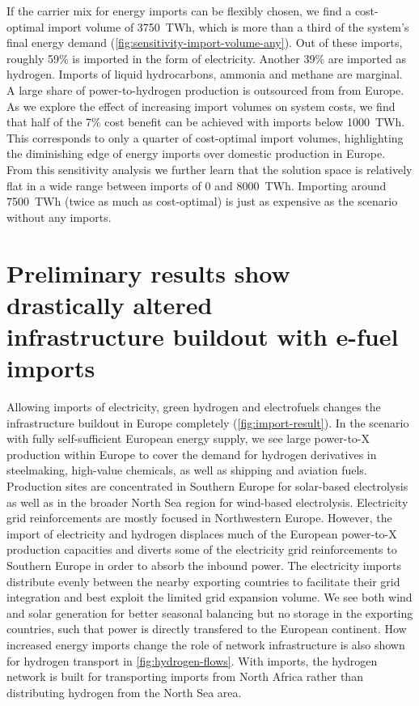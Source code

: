 \documentclass[10pt,5p,reversenotenum,lefttitle]{elsarticle}
\begin{document}
If the carrier mix for energy imports can be flexibly chosen, we find a
cost-optimal import volume of 3750~TWh, which is more than a third of the
system's final energy demand (\cref{fig:sensitivity-import-volume-any}). Out of
these imports, roughly 59\% is imported in the form of electricity. Another 39\%
are imported as hydrogen. Imports of liquid hydrocarbons, ammonia and methane
are marginal. A large share of power-to-hydrogen production is outsourced from
from Europe. As we explore the effect of increasing import volumes on system
costs, we find that half of the 7\% cost benefit can be achieved with imports
below 1000~TWh. This corresponds to only a quarter of cost-optimal import
volumes, highlighting the diminishing edge of energy imports over domestic
production in Europe. From this sensitivity analysis we further learn that the
solution space is relatively flat in a wide range between imports of 0 and
8000~TWh. Importing around 7500~TWh (twice as much as cost-optimal) is just as
expensive as the scenario without any imports.

\section*{Preliminary results show drastically altered\\infrastructure buildout with e-fuel imports}

Allowing imports of electricity, green hydrogen and electrofuels changes the
infrastructure buildout in Europe completely (\cref{fig:import-result}). In the
scenario with fully self-sufficient European energy supply, we see large
\mbox{power-to-X} production within Europe to cover the demand for hydrogen
derivatives in steelmaking, high-value chemicals, as well as shipping and
aviation fuels. Production sites are concentrated in Southern Europe for
solar-based electrolysis as well as in the broader North Sea region for
wind-based electrolysis. Electricity grid reinforcements are mostly focused in
Northwestern Europe. However, the import of electricity and hydrogen displaces
much of the European power-to-X production capacities and diverts some of the
electricity grid reinforcements to Southern Europe in order to absorb the
inbound power. The electricity imports distribute evenly between the nearby
exporting countries to facilitate their grid integration and best exploit the
limited grid expansion volume. We see both wind and solar generation for better
seasonal balancing but no storage in the exporting countries, such that power is
directly transfered to the European continent. How increased energy imports
change the role of network infrastructure is also shown for hydrogen transport
in \cref{fig:hydrogen-flows}. With imports, the hydrogen network is built for
transporting imports from North Africa rather than distributing hydrogen from
the North Sea area.
\end{document}
